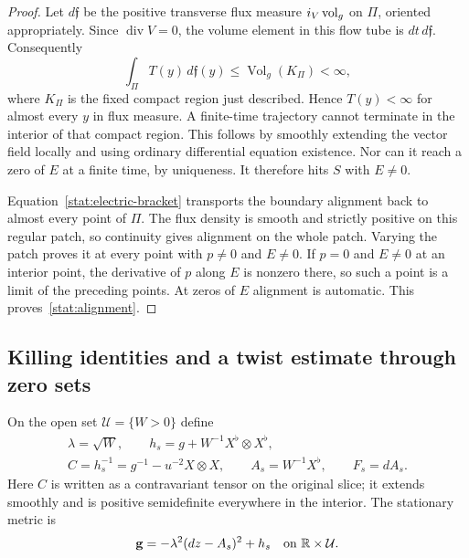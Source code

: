 \begin{proof}
Let $d\mathfrak f$ be the positive transverse flux measure
$i_V\operatorname{vol}_g$ on $\Pi$, oriented appropriately.  Since
$\operatorname{div}V=0$, the volume element in this flow tube is
$dt\,d\mathfrak f$.  Consequently
\begin{equation}
 \int_\Pi T(y)\,d\mathfrak f(y)
 \leq \operatorname{Vol}_g(K_\Pi)<\infty,
 \label{stat:flow-time-volume}
\end{equation}
where $K_\Pi$ is the fixed compact region just described.  Hence
$T(y)<\infty$ for almost every $y$ in flux measure.  A finite-time
trajectory cannot terminate in the interior of that compact region.
This follows by smoothly extending the vector field locally and using
ordinary differential equation existence.  Nor can it reach a zero
of $E$ at a finite time, by uniqueness.  It therefore hits $S$ with
$E\ne0$.

Equation~\eqref{stat:electric-bracket} transports the boundary
alignment back to almost every point of $\Pi$.  The flux density is
smooth and strictly positive on this regular patch, so continuity
gives alignment on the whole patch.  Varying the patch proves it at
every point with $p\ne0$ and $E\ne0$.  If $p=0$ and $E\ne0$ at an
interior point, the derivative of $p$ along $E$ is nonzero there,
so such a point is a limit of the preceding points.  At zeros of $E$
alignment is automatic.  This proves~\eqref{stat:alignment}.
\end{proof}

\subsection{Killing identities and a twist estimate through zero sets}

On the open set $\mathcal U=\{W>0\}$ define
\begin{equation}
\begin{gathered}
 \lambda=\sqrt W,\qquad
 h_s=g+W^{-1}X^\flat\otimes X^\flat,\\
 C=h_s^{-1}=g^{-1}-u^{-2}X\otimes X,\qquad
 A_s=W^{-1}X^\flat,\qquad F_s=dA_s.
\end{gathered}
 \label{stat:orbit-quantities}
\end{equation}
Here $C$ is written as a contravariant tensor on the original slice;
it extends smoothly and is positive semidefinite everywhere in the
interior.  The stationary metric is
\begin{equation}
 \mathbf g=-\lambda^2(dz-A_s)^2+h_s
 \quad\hbox{on }\mathbb R\times\mathcal U.
 \label{stat:orbit-splitting}
\end{equation}

